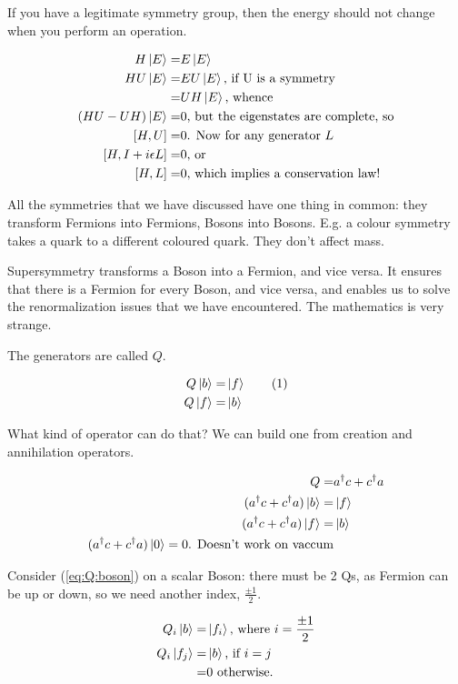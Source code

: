 \documentclass[]{article}
\newcommand\numberthis{\addtocounter{equation}{1}\tag{\theequation}}
\begin{document}
If you have a legitimate symmetry group, then the energy should not change when you perform an operation.

\begin{align*}
	H \ket{E} =& E \ket{E}\\
	HU \ket{E} =& E U\ket{E} \text{, if U is a symmetry}\\
	=& U H \ket{E} \text{, whence}\\
	(HU - UH) \ket{E} =& 0 \text{, but the eigenstates are complete, so}\\
	[H,U]=&0 \text{. Now for any generator $L$}\\
	[H,I+i \epsilon L]  =& 0 \text{, or}\\
	[H,L] =& 0 \text{, which implies a conservation law!}
\end{align*}

All the symmetries that we have discussed have one thing in common: they transform Fermions into Fermions, Bosons into Bosons. E.g. a colour symmetry takes a quark to a different coloured quark. They don't affect mass.

Supersymmetry transforms a Boson into a Fermion, and vice versa. It ensures that there is a Fermion for every Boson, and vice versa, and enables us to solve the renormalization issues that we have encountered. The mathematics is very strange.

The generators are called $Q$.

\begin{align*}
	Q \ket{b} =& \ket{f} \numberthis \label{eq:Q:boson}\\
	Q \ket{f} =& \ket{b}
\end{align*}

What kind of operator can do that? We can build one from creation and annihilation operators.

\begin{align*}
	Q =& a^\dagger c + c^\dagger a \\
	(a^\dagger c + c^\dagger a) \ket{b} =& \ket{f}\\
	(a^\dagger c + c^\dagger a) \ket{f} =& \ket{b}\\
	(a^\dagger c + c^\dagger a) \ket{0} = 0 \text{. Doesn't work on vaccum}
\end{align*}

Consider (\ref{eq:Q:boson}) on a scalar Boson: there must be 2 Qs, as Fermion can be up or down, so we need another index, $\frac{\pm 1}{2}$.

\begin{align*}
Q_i \ket{b} =& \ket{f_i} \text{, where $i=\frac{\pm 1}{2}$}\\
Q_i \ket{f_j} =& \ket{b} \text{, if $i=j$}\\
=& 0 \text{ otherwise.}
\end{align*}
\end{document}
